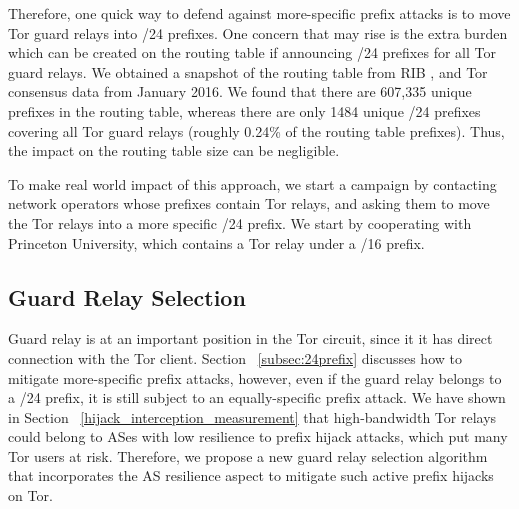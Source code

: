 Therefore, one quick way to defend against more-specific prefix attacks is to move Tor guard relays into /24 prefixes. One concern that may rise is the extra burden which can be created on the routing table if announcing /24 prefixes for all Tor guard relays. We obtained a snapshot of the routing table from RIB , and Tor consensus data from January 2016. We found that there are 607,335 unique prefixes in the routing table, whereas there are only 1484 unique /24 prefixes covering all Tor guard relays (roughly 0.24\% of the routing table prefixes). Thus, the impact on the routing table size can be negligible. 

To make real world impact of this approach, we start a campaign by contacting network operators whose prefixes contain Tor relays, and asking them to move the Tor relays into a more specific /24 prefix. We start by cooperating with Princeton University, which contains a Tor relay under a /16 prefix. 

\subsection{Guard Relay Selection}
\label{subsec:relayselection}

Guard relay is at an important position in the Tor circuit, since it  it has direct connection with the Tor client. Section ~\ref{subsec:24prefix} discusses how to mitigate more-specific prefix attacks, however, even if the guard relay belongs to a /24 prefix, it is still subject to an equally-specific prefix attack. We have shown in Section ~\ref{hijack_interception_measurement} that high-bandwidth Tor relays could belong to ASes with low resilience to prefix hijack attacks, which put many Tor users at risk. Therefore, we propose a new guard relay selection algorithm that incorporates the AS resilience aspect to mitigate such active prefix hijacks on Tor.


